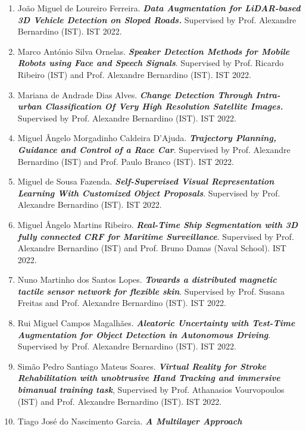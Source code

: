 \begin{enumerate}
  Inês Gaspar Coelho. \emph{\textbf{Improving image stitching methods
  for mapping low texture wind turbine blades.}} Supervised by Prof.
  Alexandre Bernardino (IST). IST 2022.
\item
  João Miguel de Loureiro Ferreira. \emph{\textbf{Data Augmentation for
  LiDAR-based 3D Vehicle Detection on Sloped Roads.}} Supervised by
  Prof. Alexandre Bernardino (IST). IST 2022.
\item
  Marco António Silva Ornelas. \emph{\textbf{Speaker Detection Methods
  for Mobile Robots using Face and Speech Signals}}. Supervised by Prof.
  Ricardo Ribeiro (IST) and Prof. Alexandre Bernardino (IST). IST 2022.
\item
  Mariana de Andrade Dias Alves. \emph{\textbf{Change Detection Through
  Intra-urban Classification Of Very High Resolution Satellite Images.}}
  Supervised by Prof. Alexandre Bernardino (IST). IST 2022.
\item
  Miguel Ângelo Morgadinho Caldeira D'Ajuda. \emph{\textbf{Trajectory
  Planning, Guidance and Control of a Race Car}}. Supervised by Prof.
  Alexandre Bernardino (IST) and Prof. Paulo Branco (IST). IST 2022.
\item
  Miguel de Sousa Fazenda. \emph{\textbf{Self-Supervised Visual
  Representation Learning With Customized Object Proposals}}. Supervised
  by Prof. Alexandre Bernardino (IST). IST 2022.
\item
  Miguel Ângelo Martins Ribeiro. \emph{\textbf{Real-Time Ship
  Segmentation with 3D fully connected CRF for Maritime Surveillance}}.
  Supervised by Prof. Alexandre Bernardino (IST) and Prof. Bruno Damas
  (Naval School). IST 2022.
\item
  Nuno Martinho dos Santos Lopes. \emph{\textbf{Towards a distributed
  magnetic tactile sensor network for flexible skin}}. Supervised by
  Prof. Susana Freitas and Prof. Alexandre Bernardino (IST). IST 2022.
\item
  Rui Miguel Campos Magalhães. \emph{\textbf{Aleatoric Uncertainty with
  Test-Time Augmentation for Object Detection in Autonomous Driving}}.
  Supervised by Prof. Alexandre Bernardino (IST). IST 2022.
\item
  Simão Pedro Santiago Mateus Soares. \emph{\textbf{Virtual Reality for
  Stroke Rehabilitation with unobtrusive Hand Tracking and immersive
  bimanual training task}}, Supervised by Prof. Athanasios Vourvopoulos
  (IST) and Prof. Alexandre Bernardino (IST). IST 2022.
\item
  Tiago José do Nascimento Garcia. \emph{\textbf{A Multilayer Approach
}}
\end{enumerate}
